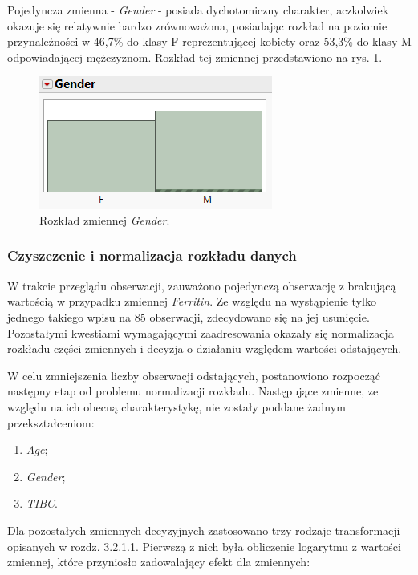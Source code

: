 	Pojedyncza zmienna - \textit{Gender} - posiada dychotomiczny charakter, aczkolwiek okazuje się relatywnie bardzo zrównoważona, posiadając rozkład na poziomie przynależności w 46,7\% do klasy F reprezentującej kobiety oraz 53,3\% do klasy M odpowiadającej mężczyznom. Rozkład tej zmiennej przedstawiono na rys. \ref{fig:mnf}.
	
	\begin{figure}[!ht]
		\centering
		\includegraphics[width=0.6\linewidth]{Rozdzial3/mnf}
		\caption{Rozkład zmiennej \textit{Gender}.}
		\label{fig:mnf}
	\end{figure}
	
	\subsubsection{Czyszczenie i normalizacja rozkładu danych}
	
	W trakcie przeglądu obserwacji, zauważono pojedynczą obserwację z brakującą wartością w przypadku zmiennej \textit{Ferritin}. Ze względu na wystąpienie tylko jednego takiego wpisu na 85 obserwacji, zdecydowano się na jej usunięcie. Pozostałymi kwestiami wymagającymi zaadresowania okazały się normalizacja rozkładu części zmiennych i decyzja o działaniu względem wartości odstających.
	
	W celu zmniejszenia liczby obserwacji odstających, postanowiono rozpocząć następny etap od problemu normalizacji rozkładu. Następujące zmienne, ze względu na ich obecną charakterystykę, nie zostały poddane żadnym przekształceniom:
	
	\begin{enumerate}
		\item \textit{Age};
		\item \textit{Gender};
		\item \textit{TIBC}.
	\end{enumerate}

	Dla pozostałych zmiennych decyzyjnych zastosowano trzy rodzaje transformacji opisanych w rozdz. 3.2.1.1. Pierwszą z nich była obliczenie logarytmu z wartości zmiennej, które przyniosło zadowalający efekt dla zmiennych:
	
